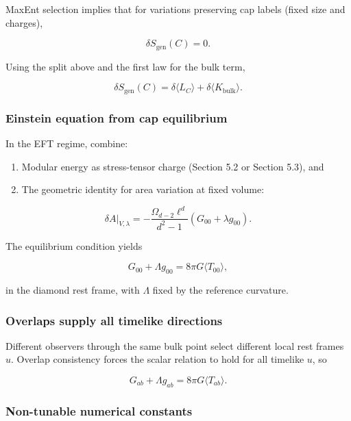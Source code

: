 \documentclass[11pt,a4paper]{article}
\theoremstyle{remark}
\providecommand{\tightlist}{%
  \setlength{\itemsep}{0pt}\setlength{\parskip}{0pt}}
\begin{document}
MaxEnt selection implies that for variations preserving cap labels (fixed size
and charges),

\[
\delta S_{\mathrm{gen}}(C) = 0.
\]

Using the split above and the first law for the bulk term,

\[
\delta S_{\mathrm{gen}}(C) = \delta \langle L_C \rangle + \delta \langle K_{\mathrm{bulk}} \rangle.
\]

\subsubsection{Einstein equation from cap equilibrium}\label{einstein-equation-from-cap-equilibrium}

In the EFT regime, combine:

\begin{enumerate}
\def\labelenumi{\arabic{enumi})}
\tightlist
\item
  Modular energy as stress-tensor charge (Section 5.2 or Section 5.3), and
\item
  The geometric identity for area variation at fixed volume:
\end{enumerate}

\[
\delta A|_{V,\lambda} = -\frac{\Omega_{d-2} \ell^d}{d^2 - 1} (G_{00} + \lambda g_{00}).
\]

The equilibrium condition yields

\[
G_{00} + \Lambda g_{00} = 8 \pi G \langle T_{00} \rangle,
\]

in the diamond rest frame, with \(\Lambda\) fixed by the reference curvature.

\subsubsection{Overlaps supply all timelike directions}\label{overlaps-supply-all-timelike-directions}

Different observers through the same bulk point select different local rest
frames \(u\). Overlap consistency forces the scalar relation to hold for all
timelike \(u\), so

\[
G_{ab} + \Lambda g_{ab} = 8 \pi G \langle T_{ab} \rangle.
\]

\subsubsection{Non-tunable numerical constants}\label{non-tunable-numerical-constants}
\end{document}
